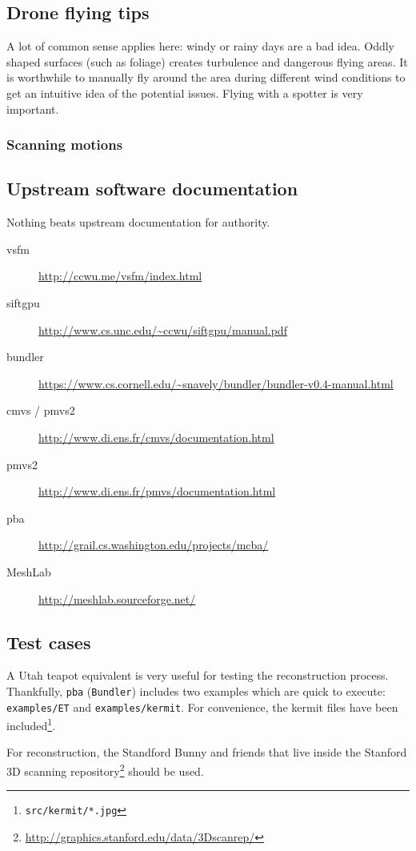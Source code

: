\subsection{Drone flying tips}
A lot of common sense applies here: windy or rainy days are a bad idea. Oddly shaped surfaces (such as foliage) creates turbulence and dangerous flying areas. It is worthwhile to manually fly around the area during different wind conditions to get an intuitive idea of the potential issues. Flying with a spotter is very important.

\subsubsection{Scanning motions}

\subsection{Upstream software documentation}
Nothing beats upstream documentation for authority.
\begin{description}
    \item[vsfm] \url{http://ccwu.me/vsfm/index.html}
    \item[siftgpu] \url{http://www.cs.unc.edu/~ccwu/siftgpu/manual.pdf}
    \item[bundler] \url{https://www.cs.cornell.edu/~snavely/bundler/bundler-v0.4-manual.html}
    \item[cmvs / pmvs2] \url{http://www.di.ens.fr/cmvs/documentation.html}
    \item[pmvs2] \url{http://www.di.ens.fr/pmvs/documentation.html}
    \item[pba] \url{http://grail.cs.washington.edu/projects/mcba/}
    \item[MeshLab] \url{http://meshlab.sourceforge.net/}
\end{description}
\subsection{Test cases}
A Utah teapot equivalent is very useful for testing the reconstruction process. Thankfully, {\tt pba} ({\tt Bundler}) includes two examples which are quick to execute: {\tt examples/ET} and {\tt examples/kermit}. For convenience, the kermit files have been included\footnote{{\tt src/kermit/*.jpg}}.

For reconstruction, the Standford Bunny and friends that live inside the Stanford 3D scanning repository\footnote{\url{http://graphics.stanford.edu/data/3Dscanrep/}} should be used.

